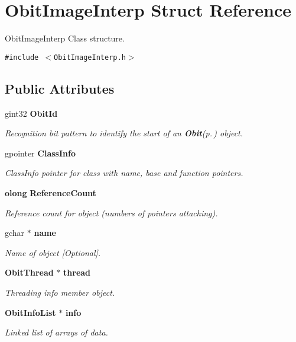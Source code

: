\section{Obit\-Image\-Interp Struct Reference}
\label{structObitImageInterp}
Obit\-Image\-Interp Class structure.  


{\tt \#include $<$Obit\-Image\-Interp.h$>$}

\subsection*{Public Attributes}
\begin{CompactItemize}
\item 
gint32 {\bf Obit\-Id}
\begin{CompactList}\small\item\em Recognition bit pattern to identify the start of an {\bf Obit}{\rm (p.\,\pageref{structObit})} object. \item\end{CompactList}\item 
gpointer {\bf Class\-Info}
\begin{CompactList}\small\item\em Class\-Info pointer for class with name, base and function pointers. \item\end{CompactList}\item 
{\bf olong} {\bf Reference\-Count}
\begin{CompactList}\small\item\em Reference count for object (numbers of pointers attaching). \item\end{CompactList}\item 
gchar $\ast$ {\bf name}
\begin{CompactList}\small\item\em Name of object [Optional]. \item\end{CompactList}\item 
{\bf Obit\-Thread} $\ast$ {\bf thread}
\begin{CompactList}\small\item\em Threading info member object. \item\end{CompactList}\item 
{\bf Obit\-Info\-List} $\ast$ {\bf info}
\begin{CompactList}\small\item\em Linked list of arrays of data. \item\end{CompactList}\item 

\end{CompactItemize}
